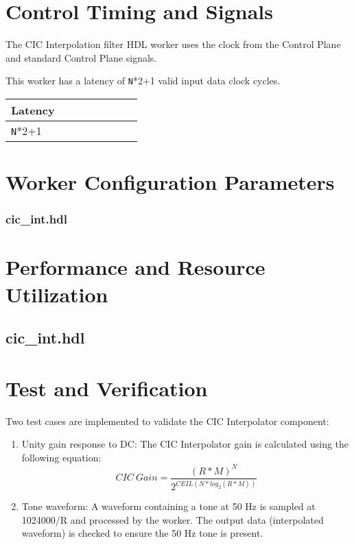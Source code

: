 \documentclass{article}
\def\comp{cic\_int}
\edef\ecomp{cic_int}
\begin{document}
\section*{Control Timing and Signals}
\begin{flushleft}
	The CIC Interpolation filter HDL worker uses the clock from the Control Plane and standard Control Plane signals.\medskip


	This worker has a latency of \verb+N+*2+1 valid input data clock cycles.\medskip

	\begin{tabular}{|M{4.5cm}|M{4.5cm}|M{1cm}|M{1.5cm}|M{2cm}|M{1cm}|M{1cm}|M{2.5cm}|}
		\hline
		\hline
		Latency         \\
		\hline
		\verb+N+*2+1    \\
		\hline
	\end{tabular}
\end{flushleft}

\begin{landscape}
\section*{Worker Configuration Parameters}
\subsubsection*{\comp.hdl}
%
\section*{Performance and Resource Utilization}
\subsection*{\comp.hdl}
%
\end{landscape}
\newpage
\section*{Test and Verification}
Two test cases are implemented to validate the CIC Interpolator component:

\begin{enumerate}
	\item Unity gain response to DC: The CIC Interpolator gain is calculated using the following equation:
	      \begin{equation} \label{eq:cic_gain}
	      	CIC\ Gain = \frac{(R*M)^N}{2^{CEIL(N*log_2(R*M))}}
	      \end{equation}
	\item Tone waveform: A waveform containing a tone at 50 Hz is sampled at 1024000/R and processed by the worker. The output data (interpolated waveform) is checked to ensure the 50 Hz tone is present.
\end{enumerate}\medskip
\end{document}
